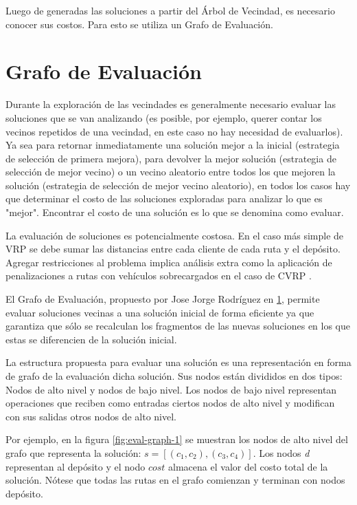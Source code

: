 Luego de generadas las soluciones a partir del Árbol de Vecindad, es necesario conocer sus costos. Para esto se utiliza un Grafo de Evaluación.

\section{Grafo de Evaluación}\label{2-JJ}
Durante la exploración de las vecindades es generalmente necesario evaluar las soluciones que se van analizando (es posible, por ejemplo, querer contar los vecinos repetidos de una vecindad, en este caso no hay necesidad de evaluarlos). Ya sea para retornar inmediatamente una solución mejor a la inicial (estrategia de selección de primera mejora), para devolver la mejor solución (estrategia de selección de mejor vecino) o un vecino aleatorio entre todos los que mejoren la solución (estrategia de selección de mejor vecino aleatorio), en todos los casos hay que determinar el costo de las soluciones exploradas para analizar lo que es "mejor". Encontrar el costo de una solución es lo que se denomina como evaluar.

La evaluación de soluciones es potencialmente costosa. En el caso más simple de VRP se debe sumar las distancias entre cada cliente de cada ruta y el depósito. Agregar restricciones al problema implica análisis extra como la aplicación de penalizaciones a rutas con vehículos sobrecargados en el caso de CVRP \cite{TODO}.

El Grafo de Evaluación, propuesto por Jose Jorge Rodríguez en \ref{2-JJ}, permite evaluar soluciones vecinas a una solución inicial de forma eficiente ya que garantiza que sólo se recalculan los fragmentos de las nuevas soluciones en los que estas se diferencien de la solución inicial.

La estructura propuesta para evaluar una solución es una representación en forma de grafo de la evaluación dicha solución. Sus nodos están divididos en dos tipos: Nodos de alto nivel y nodos de bajo nivel. Los nodos de bajo nivel representan operaciones que reciben como entradas ciertos nodos de alto nivel y modifican con sus salidas otros nodos de alto nivel.

Por ejemplo, en la figura \ref{fig:eval-graph-1} se muestran los nodos de alto nivel del grafo que representa la solución: $s = [(c_1,c_2), (c_3,c_4)]$. Los nodos \textit{d} representan al depósito y el nodo $cost$ almacena el valor del costo total de la solución. Nótese que todas las rutas en el grafo comienzan y terminan con nodos depósito. 

